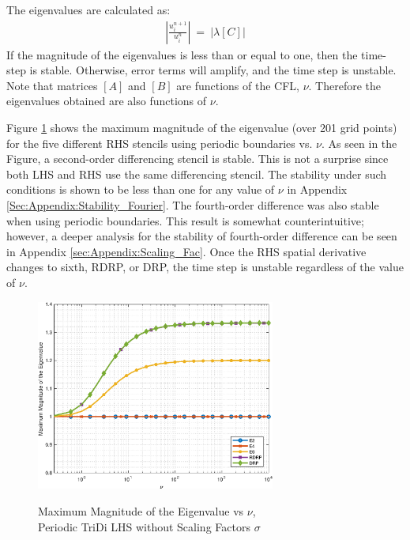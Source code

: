 \documentclass[conf]{new-aiaa}
\begin{document}
The eigenvalues are calculated as:
\begin{equation}
	\begin{split}
		\label{eq:Magnitude_Of_Eigen}
  			\left|\frac{u_i^{n+1}}{u_i^{n}}\right|~=~\left|\lambda\left[C\right]\right|
	\end{split}
\end{equation}
If the magnitude of the eigenvalues is less than or equal to one, then the time-step is stable.  
Otherwise, error terms will amplify, and the time step is unstable.
Note that matrices $[A]$ and $[B]$ are functions of the CFL, $\nu$. 
Therefore the eigenvalues obtained are also functions of $\nu$. 

Figure \ref{fig:nu_vs_magnitude} shows the maximum magnitude of the eigenvalue (over 201 grid points) for the five different RHS stencils using periodic boundaries vs. $\nu$. 
As seen in the Figure, a second-order differencing stencil is stable. 
This is not a surprise since both LHS and RHS use the same differencing stencil. 
The stability under such conditions is shown to be less than one for any value of $\nu$ in Appendix \ref{Sec:Appendix:Stability_Fourier}.
The fourth-order difference was also stable when using periodic boundaries. 
This result is somewhat counterintuitive; however, a deeper analysis for the stability of fourth-order difference can be seen in Appendix \ref{sec:Appendix:Scaling_Fac}. 
Once the RHS spatial derivative changes to sixth, RDRP, or DRP, the time step is unstable regardless of the value of $\nu$. 


\begin{figure}[hbtp!]
	\centering
	{\includegraphics[width=0.7\textwidth]{Figures/nu_vs_magnitude}}
	\caption{Maximum Magnitude of the Eigenvalue vs $\nu$,    \\
	Periodic TriDi LHS without Scaling Factors $\sigma$}
	\label{fig:nu_vs_magnitude}
\end{figure}
\end{document}
